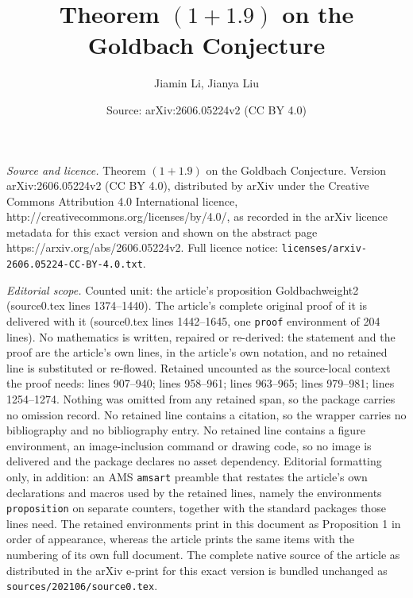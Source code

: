 \documentclass[10pt,a4paper]{amsart}
\title{Theorem $(1+1.9)$ on the Goldbach Conjecture}
\author{Jiamin Li, Jianya Liu}
\date{Source: arXiv:2606.05224v2 (CC BY 4.0)}
\begin{document}
\maketitle

\noindent\emph{Source and licence.} Theorem $(1+1.9)$ on the Goldbach Conjecture. Version arXiv:2606.05224v2 (CC BY 4.0), distributed by arXiv under the Creative Commons Attribution 4.0 International licence, http://creativecommons.org/licenses/by/4.0/, as recorded in the arXiv licence metadata for this exact version and shown on the abstract page https://arxiv.org/abs/2606.05224v2. Full licence notice: \texttt{licenses/arxiv-2606.05224-CC-BY-4.0.txt}.\par\smallskip

\noindent\textit{Editorial scope.} Counted unit: the article's proposition Goldbachweight2 (source0.tex lines 1374--1440). The article's complete original proof of it is delivered with it (source0.tex lines 1442--1645, one \texttt{proof} environment of 204 lines). No mathematics is written, repaired or re-derived: the statement and the proof are the article's own lines, in the article's own notation, and no retained line is substituted or re-flowed.  Retained uncounted as the source-local context the proof needs: lines 907--940; lines 958--961; lines 963--965; lines 979--981; lines 1254--1274.  Nothing was omitted from any retained span, so the package carries no omission record.  No retained line contains a citation, so the wrapper carries no bibliography and no bibliography entry.  No retained line contains a figure environment, an image-inclusion command or drawing code, so no image is delivered and the package declares no asset dependency.  Editorial formatting only, in addition: an AMS \texttt{amsart} preamble that restates the article's own declarations and macros used by the retained lines, namely the environments \texttt{proposition} on separate counters, together with the standard packages those lines need.  The retained environments print in this document as Proposition 1 in order of appearance, whereas the article prints the same items with the numbering of its own full document.  The complete native source of the article as distributed in the arXiv e-print for this exact version is bundled unchanged as \texttt{sources/202106/source0.tex}.
\end{document}
